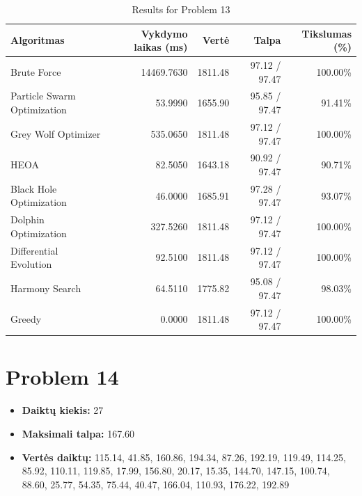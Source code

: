 \documentclass[a4paper,11pt]{article}
\begin{document}
\begin{table}[h!]
\centering
\begin{tabular}{lrrrr}
\toprule
\textbf{Algoritmas} & \textbf{Vykdymo laikas (ms)} & \textbf{Vertė} & \textbf{Talpa} & \textbf{Tikslumas (\%)} \\
\midrule
Brute Force & 14469.7630 & 1811.48 & 97.12 / 97.47 & 100.00\% \\
Particle Swarm Optimization & 53.9990 & 1655.90 & 95.85 / 97.47 & 91.41\% \\
Grey Wolf Optimizer & 535.0650 & 1811.48 & 97.12 / 97.47 & 100.00\% \\
HEOA & 82.5050 & 1643.18 & 90.92 / 97.47 & 90.71\% \\
Black Hole Optimization & 46.0000 & 1685.91 & 97.28 / 97.47 & 93.07\% \\
Dolphin Optimization & 327.5260 & 1811.48 & 97.12 / 97.47 & 100.00\% \\
Differential Evolution & 92.5100 & 1811.48 & 97.12 / 97.47 & 100.00\% \\
Harmony Search & 64.5110 & 1775.82 & 95.08 / 97.47 & 98.03\% \\
Greedy & 0.0000 & 1811.48 & 97.12 / 97.47 & 100.00\% \\
\bottomrule
\end{tabular}
\caption{Results for Problem 13}
\end{table}
\clearpage

\section*{Problem 14}
\begin{itemize}
    \item \textbf{Daiktų kiekis:} 27
    \item \textbf{Maksimali talpa:} 167.60
    \item \textbf{Vertės daiktų:} 115.14, 41.85, 160.86, 194.34, 87.26, 192.19, 119.49, 114.25, 85.92, 110.11, 119.85, 17.99, 156.80, 20.17, 15.35, 144.70, 147.15, 100.74, 88.60, 25.77, 54.35, 75.44, 40.47, 166.04, 110.93, 176.22, 192.89
\end{itemize}
\end{document}
